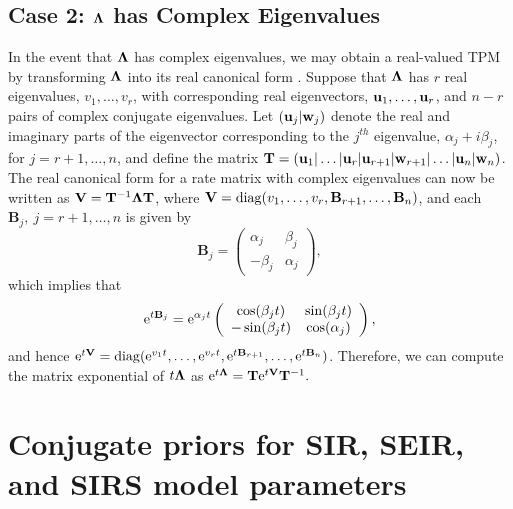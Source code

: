 \subsection{Case 2: $ \boldsymbol{\Lambda} $ has Complex Eigenvalues}
In the event that $ \boldsymbol{\Lambda} $ has complex eigenvalues, we may obtain a real-valued TPM by transforming $ \boldsymbol{\Lambda} $ into its real canonical form \citep{hirsch2013differential}. Suppose that $ \boldsymbol{\Lambda} $ has $ r $ real eigenvalues, $ v_1,\dots,v_r $, with corresponding real eigenvectors, $ \mathbf{u}_1,\dots,\mathbf{u}_r $, and $ n-r $ pairs of complex conjugate eigenvalues. Let $ (\mathbf{u}_j|\mathbf{w}_j) $ denote the real and imaginary parts of the eigenvector corresponding to the $ j^{th} $ eigenvalue, $ \alpha_j + i\beta_j $, for $ j = r+1,\dots,n $, and define the matrix $ \mathbf{T} = \left (\mathbf{u}_1|\dots|\mathbf{u}_r|\mathbf{u}_{r+1}|\mathbf{w}_{r+1}|\dots|\mathbf{u}_n|\mathbf{w}_n\right ) $. 
The real canonical form for a rate matrix with complex eigenvalues can now be written as $ \mathbf{V} = \mathbf{T}^{-1}\boldsymbol{\Lambda} \mathbf{T} $, where $ \mathbf{V} = \mathrm{diag}(v_1,\dots,v_r,\mathbf{B}_{r+1},\dots, \mathbf{B}_n) $, and each $ \mathbf{B}_j,\ j=r+1,\dots,n $ is given by 
\[ \mathbf{B}_j = \left (\begin{array}{cc}
\alpha_j & \beta_j \\
-\beta_j & \alpha_j
\end{array}\right ), \]
which implies that 
\[ \mathrm{e}^{t\mathbf{B}_j} = \mathrm{e}^{\alpha_jt}\left (\begin{array}{cc}
\cos(\beta_jt) & \sin(\beta_jt) \\
-\sin(\beta_jt) & \cos(\alpha_j)
\end{array}\right ), \]
and hence $ \mathrm{e}^{t\mathbf{V}} = \mathrm{diag}(\mathrm{e}^{v_1t},\dots,\mathrm{e}^{v_rt},\mathrm{e}^{t\mathbf{B}_{r+1}},\dots, \mathrm{e}^{t\mathbf{B}_n}) $. Therefore, we can compute the matrix exponential of $ t\boldsymbol{\Lambda} $ as $ \mathrm{e}^{t\boldsymbol{\Lambda}} = \mathbf{T}\mathrm{e}^{t\mathbf{V}}\mathbf{T}^{-1}. $

\newpage
\section{Conjugate priors for SIR, SEIR, and SIRS model parameters}
\label{sec:bda_priors}

